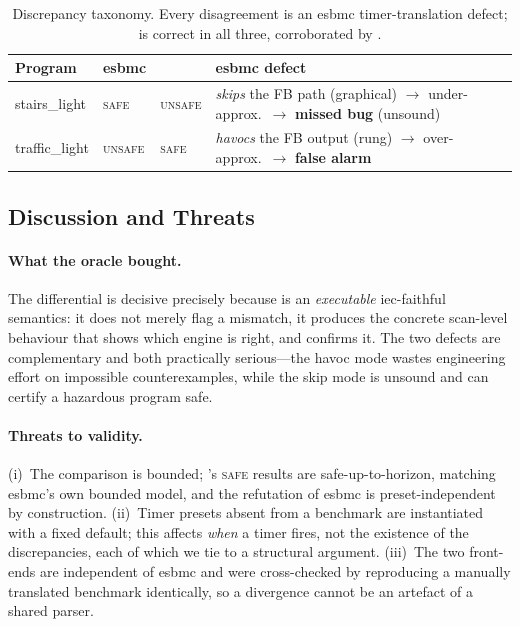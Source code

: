 \begin{table}[t]
  \centering
  \caption{Discrepancy taxonomy. Every disagreement is an \gls{esbmc} timer-translation
    defect; \kld{} is correct in all three, corroborated by \openplc{}.}
  \label{tab:e3tax}
  \small
  \begin{tabular}{@{}lllp{3.5cm}@{}}
    \toprule
    Program & \gls{esbmc} & \kld{} & \gls{esbmc} defect \\
    \midrule
    stairs\_light   & \textsc{safe}   & \textsc{unsafe} & \emph{skips} the FB path (graphical) $\rightarrow$ under-approx.\ $\rightarrow$ \textbf{missed bug} (unsound) \\
    traffic\_light  & \textsc{unsafe} & \textsc{safe}   & \emph{havocs} the FB output (rung) $\rightarrow$ over-approx.\ $\rightarrow$ \textbf{false alarm} \\
    \bottomrule
  \end{tabular}
\end{table}

\subsection{Discussion and Threats}
\label{sec:e3:threats}

\paragraph{What the oracle bought.} The differential is decisive precisely because
\kld{} is an \emph{executable} \gls{iec}-faithful semantics: it does not merely flag a
mismatch, it produces the concrete scan-level behaviour that shows which engine is
right, and \openplc{} confirms it. The two defects are complementary and both
practically serious---the havoc mode wastes engineering effort on impossible
counterexamples, while the skip mode is unsound and can certify a hazardous program safe.

\paragraph{Threats to validity.} (i)~The comparison is bounded; \kld{}'s \textsc{safe}
results are safe-up-to-horizon, matching \gls{esbmc}'s own bounded model, and the
 refutation of \gls{esbmc} is preset-independent by construction.
(ii)~Timer presets absent from a benchmark are instantiated with a fixed default; this
affects \emph{when} a timer fires, not the existence of the discrepancies, each of
which we tie to a structural argument. (iii)~The two front-ends are independent of
\gls{esbmc} and were cross-checked by reproducing a manually translated benchmark
identically, so a divergence cannot be an artefact of a shared parser.
